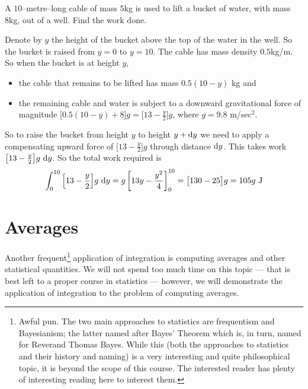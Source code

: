 \begin{eg}\label{eg:WKcable}
A $10$--metre--long cable of mass $5$kg is used to lift a bucket of water,
with mass 8kg, out of a well. Find the work done.

\soln
Denote by $y$ the height of the bucket above the top of the water in the well.
So the bucket is raised from $y=0$ to $y=10$. The cable has mass density
$0.5$kg/m. So when the bucket is at height $y$,
\begin{itemize}\itemsep1pt \parskip0pt  %
\item the cable that remains to be lifted has mass $0.5(10-y)$ kg and
\item the remaining cable and water is subject to a downward gravitational
force of magnitude $\big[0.5(10-y) + 8\big]g=\big[13-\frac{y}{2}\big]g$,
where $g=9.8$ m/sec$^2$.
\end{itemize}
So to raise the bucket from height $y$ to height $y+\mathrm{d}y$ we need
to apply a compensating upward force of $\big[13-\frac{y}{2}\big]g$
through distance $\mathrm{d}y$. This takes work
$\big[13-\frac{y}{2}\big]g\ \dee{y}$.
So the total work required is
\begin{equation*}
\int_0^{10}\Big[13-\frac{y}{2}\Big]g\ \mathrm{d}y
=g\left[13 y-\frac{y^2}{4}\right]_0^{10}
=\big[130-25\big]g
=105 g\ \mathrm{J}
\end{equation*}

\end{eg}


\section{Averages}\label{sec avg}
\newcommand{\ave}{\mathrm{ave}}
\newcommand{\llt}{\left<}
\newcommand{\rgt}{\right>}

Another frequent\footnote{Awful pun. The two main approaches to statistics are
frequentism and Bayesianism; the latter named after Bayes' Theorem which is, in turn,
named for Reverand Thomas Bayes. While this (both the approaches to statistics
and their history and naming) is a very interesting and quite
philosophical topic, it is beyond the scope of this course. The interested reader has
plenty of interesting reading here to interest them.} application of integration is
computing averages and other statistical quantities. We will not spend too much time on
this topic --- that is best left to a proper course in statistics --- however, we will
demonstrate the application of integration to the problem of computing averages.

